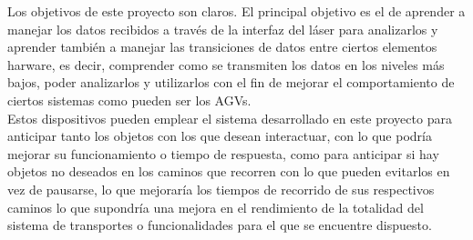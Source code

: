 
Los objetivos de este proyecto son claros. El principal objetivo es el de aprender a manejar los datos recibidos a través de la interfaz del láser para analizarlos y aprender también a manejar las transiciones de datos entre ciertos elementos harware, es decir, comprender como se transmiten los datos en los niveles más bajos, poder analizarlos y utilizarlos con el fin de mejorar el comportamiento de ciertos sistemas como pueden ser los AGVs.\\
Estos dispositivos pueden emplear el sistema desarrollado en este proyecto para anticipar tanto los objetos con los que desean interactuar, con lo que podría mejorar su funcionamiento o tiempo de respuesta, como para anticipar si hay objetos no deseados en los caminos que recorren con lo que pueden evitarlos en vez de pausarse, lo que mejoraría los tiempos de recorrido de sus respectivos caminos lo que supondría una mejora en el rendimiento de la totalidad del sistema de transportes o funcionalidades para el que se encuentre dispuesto.